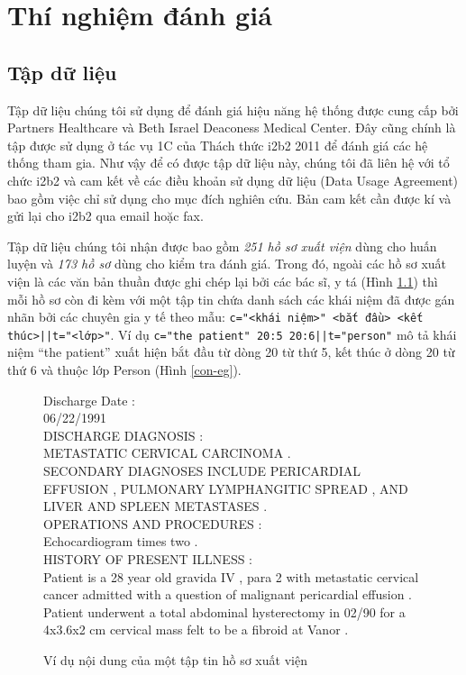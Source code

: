 \chapter{Thí nghiệm đánh giá}
\section{Tập dữ liệu}
Tập dữ liệu chúng tôi sử dụng để đánh giá hiệu năng hệ thống được cung cấp bởi Partners Healthcare và Beth Israel Deaconess Medical Center. Đây cũng chính là tập được sử dụng ở tác vụ 1C của Thách thức i2b2 2011 để đánh giá các hệ thống tham gia. Như vậy để có được tập dữ liệu này, chúng tôi đã liên hệ với tổ chức i2b2 và cam kết về các điều khoản sử dụng dữ liệu (Data Usage Agreement) bao gồm việc chỉ sử dụng cho mục đích nghiên cứu. Bản cam kết cần được kí và gửi lại cho i2b2 qua email hoặc fax.

Tập dữ liệu chúng tôi nhận được bao gồm \emph{251 hồ sơ xuất viện} dùng cho huấn luyện và \emph{173 hồ sơ} dùng cho kiểm tra đánh giá. Trong đó, ngoài các hồ sơ xuất viện là các văn bản thuần được ghi chép lại bởi các bác sĩ, y tá (Hình \ref{hsxv-eg}) thì mỗi hồ sơ còn đi kèm với một tập tin chứa danh sách các khái niệm đã được gán nhãn bởi các chuyên gia y tế theo mẫu: \texttt{c="<khái niệm>" <bắt đầu> <kết thúc>||t="<lớp>"}. Ví dụ \texttt{c="the patient" 20:5 20:6||t="person"} mô tả khái niệm ``the patient'' xuất hiện bắt đầu từ dòng 20 từ thứ 5, kết thúc ở dòng 20 từ thứ 6 và thuộc lớp Person (Hình \ref{con-eg}).

\begin{figure}[ht]
\begin{mdframed}
\ttfamily\footnotesize
Discharge Date :\\
06/22/1991\\
DISCHARGE DIAGNOSIS :\\
METASTATIC CERVICAL CARCINOMA .\\
SECONDARY DIAGNOSES INCLUDE PERICARDIAL EFFUSION , PULMONARY LYMPHANGITIC SPREAD , AND LIVER AND SPLEEN METASTASES .\\
OPERATIONS AND PROCEDURES :\\
Echocardiogram times two .\\
HISTORY OF PRESENT ILLNESS :\\
Patient is a 28 year old gravida IV , para 2 with metastatic cervical cancer admitted with a question of malignant pericardial effusion .\\
Patient underwent a total abdominal hysterectomy in 02/90 for a 4x3.6x2 cm cervical mass felt to be a fibroid at Vanor .
\end{mdframed}
\caption{Ví dụ nội dung của một tập tin hồ sơ xuất viện\label{hsxv-eg}}
\end{figure}

